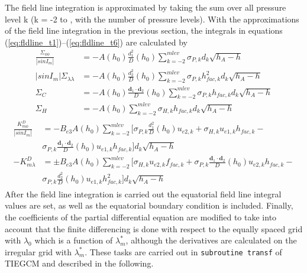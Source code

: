% 
The field line integration is
approximated by taking  the sum over all pressure level k (k = -2 to , with
 the number of pressure levels). 
With the approximations of the field line integration in the previous section, the 
integrals in 
equations (\ref{eq:fldline_t1})--(\ref{eq:fldline_t6}) are calculated by
%
\begin{align}
  \frac{\Sigma_{\phi \phi}}{|sinI_m|} &= - A(h_0) \frac{d_1^2}{D}(h_0) 
              \sum_{k=-2}^{mlev} \sigma_{P,k} d_k \sqrt{h_A-h} \\
  {|sinI_m|}{\Sigma_{\lambda \lambda}} &=  - A(h_0) \frac{d_2^2}{D}(h_0) 
              \sum_{k=-2}^{mlev} \sigma_{P,k} h_{fac,k}^2 d_k \sqrt{h_A-h}\\
  {\Sigma_{C}} &= - A(h_0) \frac{\mathbf{d}_1 \cdot \mathbf{d}_2}{D}(h_0) 
              \sum_{k=-2}^{mlev} \sigma_{P,k} h_{fac,k} d_k \sqrt{h_A-h} \\
  {\Sigma_{H}} &= - A(h_0) 
              \sum_{k=-2}^{mlev} \sigma_{H,k} h_{fac,k} d_k \sqrt{h_A-h} 
\end{align}
%
%
\begin{align}
 \begin{split}
  \frac{K_{m \phi}^D}{|sinI_m|} &= - B_{e3}  A(h_0)\sum_{k=-2}^{mlev}
         \bigl[ \sigma_{P,k}\frac{d_1^2}{D}(h_0) u_{e2,k}  +
	  \sigma_{H,k} u_{e1,k}h_{fac,k} -  \\
	  & \sigma_{P,k}
	  \frac{\mathbf{d}_1 \cdot \mathbf{d}_2}{D}(h_0)u_{e1,k}h_{fac,k} \bigr] d_k \sqrt{h_A-h}\\
  - K_{m \lambda}^D &= \pm B_{e3}  A(h_0)\sum_{k=-2}^{mlev}
      \bigl[\sigma_{H,k} u_{e2,k}f_{fac,k} +
        \sigma_{P,k}\frac{\mathbf{d}_1 \cdot \mathbf{d}_2}{D}(h_0)u_{e2,k}h_{fac,k} - \\
	&\sigma_{P,k}\frac{d_2^2}{D}(h_0) u_{e1,k} h_{fac,k}^2
	\bigr] d_k \sqrt{h_A-h}
 \end{split}
\end{align}
%
After the field line integration is carried out the equatorial field line
integral values are set, as well as the equatorial boundary condition is
included. Finally, the coefficients of the partial differential equation are modified 
to take into account that the finite differencing is done with respect to
 the equally spaced grid with $\lambda_0$ which is a function of 
 $\lambda_m^*$, although the derivatives are
 calculated on the irregular grid with  $\lambda_m^*$. 
These tasks are carried out in \texttt{subroutine transf} of TIEGCM and
described in the following. 
%

